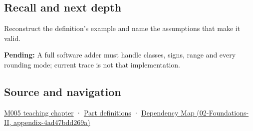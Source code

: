 \subsection{Recall and next depth}\label{recall-and-next-depth}

Reconstruct the definition's example and name the assumptions that make it valid.

\textbf{Pending:} A full software adder must handle classes, signs, range and every rounding mode; current trace is not that implementation.

\subsection{Source and navigation}\label{source-and-navigation}

\href{Continuous\%20Notes/Computing\%20Foundations\%20-\%20From\%20Bits\%20to\%20C++\%20and\%20Systems\%20APIs\#When\%20arithmetic\%20meets\%20uncertainty}{M005 teaching chapter} · \hyperref[appendix-fd090d982a15]{Part definitions} · \href{}{Dependency Map (02-Foundations-II, appendix-4ad47bdd269a)}
